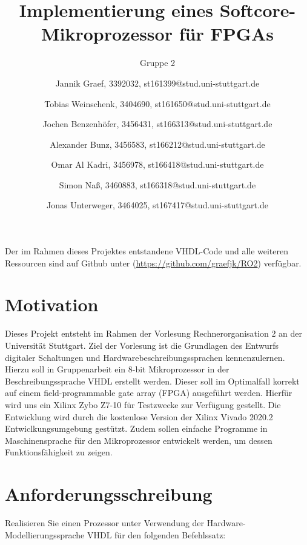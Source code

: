 \documentclass[bibliography=totoc,listof=totoc,index=totoc]{scrartcl}
\begin{document}
\title{Implementierung eines Softcore-Mikroprozessor für FPGAs}
\subtitle{Gruppe 2}
\author{Jannik Graef, 3392032, st161399@stud.uni-stuttgart.de \and
 Tobias Weinschenk, 3404690, st161650@stud.uni-stuttgart.de \and
 Jochen Benzenhöfer, 3456431, st166313@stud.uni-stuttgart.de \and
 Alexander Bunz, 3456583, st166212@stud.uni-stuttgart.de \and
 Omar Al Kadri, 3456978, st166418@stud.uni-stuttgart.de \and
 Simon Naß, 3460883, st166318@stud.uni-stuttgart.de \and
 Jonas Unterweger, 3464025, st167417@stud.uni-stuttgart.de}
\maketitle
\thispagestyle{empty} %
Der im Rahmen dieses Projektes entstandene VHDL-Code und alle weiteren Ressourcen sind auf Github unter (\url{https://github.com/graefjk/RO2}) verfügbar.
\newpage
\tableofcontents
\newpage
{} 
\section{Motivation}\label{sec:Motivation}
Dieses Projekt entsteht im Rahmen der Vorlesung Rechnerorganisation 2 an der Universität Stuttgart. Ziel der Vorlesung ist die Grundlagen des Entwurfs digitaler Schaltungen und Hardwarebeschreibungssprachen kennenzulernen. Hierzu soll in Gruppenarbeit ein 8-bit Mikroprozessor in der Beschreibungssprache VHDL erstellt werden. Dieser soll im Optimalfall korrekt auf einem \glqq field-programmable gate array\grqq $ $ (FPGA) ausgeführt werden. Hierfür wird uns ein Xilinx Zybo Z7-10 für Testzwecke zur Verfügung gestellt. Die Entwicklung wird durch die kostenlose Version der Xilinx Vivado 2020.2 Entwiclkungsumgebung gestützt. Zudem sollen einfache Programme in Maschinensprache für den Mikroprozessor entwickelt werden, um dessen Funktionsfähigkeit zu zeigen.

\section{Anforderungsschreibung}\label{sec:Anforderungsschreibung}
Realisieren Sie einen Prozessor unter Verwendung der Hardware-Modellierungssprache VHDL für den folgenden Befehlssatz:
\end{document}

